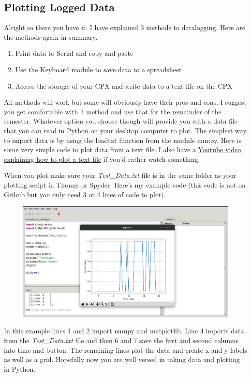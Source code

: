 \subsection{Plotting Logged Data}

Alright so there you have it. I have explained 3 methods to
datalogging. Here are the methods again in summary.

\begin{enumerate}[itemsep=-5pt]
\item Print data to Serial and copy and paste
\item Use the Keyboard module to save data to a spreadsheet
\item Access the storage of your CPX and write data to a text file on the CPX
\end{enumerate}

All methods will work but some will obviously have their pros and
cons. I suggest you get comfortable with 1 method and use that for the
remainder of the semester. Whatever option you choose though will
provide you with a data file that you can read in Python on your
desktop computer to plot. The simplest way to import data is by using
the loadtxt function from the module numpy. Here is some very simple
code to plot data from a text file. I also have a \href{https://www.youtube.com/watch?v=tJOz-ty-2ec&list=PL_D7_GvGz-v1RsDs_OdNW65qRjEjmpfQx&index=12}{Youtube video
explaining how to plot a text file} if you’d rather watch something. 

When you plot make sure your {\it Test\_Data.txt} file is in the same folder
as your plotting script in Thonny or Spyder. Here’s my example code
(this code is not on Github but you only need 3 or 4 lines of code to plot). 
\begin{figure}[H]
  \begin{center}
    \includegraphics[width=\textwidth]{Figures/plotdata.png}
  \end{center}
\end{figure}
In this example lines 1 and 2 import numpy and matplotlib. Line 4
imports data from the {\it Test\_Data.txt} file and then 6 and 7 save the
first and second columns into time and button. The remaining lines
plot the data and create x and y labels as well as a grid. Hopefully
now you are well versed in taking data and plotting in Python.

